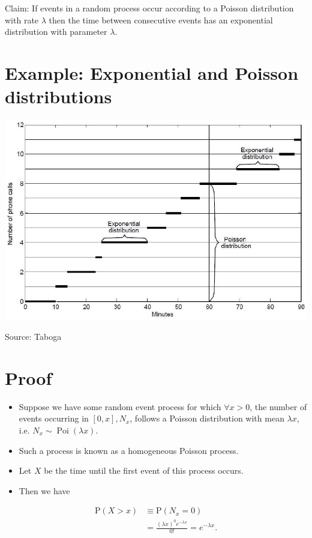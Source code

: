 \documentclass[10pt]{article}
\begin{document}
Claim: If events in a random process occur according to a Poisson distribution with rate $\lambda$ then the time between consecutive events has an exponential distribution with parameter $\lambda$.

\section*{Example: Exponential and Poisson distributions}
\begin{center}
\includegraphics[max width=\textwidth]{2025_05_11_1201cfe24e14b364b4ecg-29}
\end{center}

Source: Taboga

\section*{Proof}
\begin{itemize}
  \item Suppose we have some random event process for which $\forall x>0$, the number of events occurring in $[0, x], N_{x}$, follows a Poisson distribution with mean $\lambda x$, i.e. $N_{x} \sim \operatorname{Poi}(\lambda x)$.
  \item Such a process is known as a homogeneous Poisson process.
  \item Let $X$ be the time until the first event of this process occurs.
  \item Then we have
\end{itemize}

$$
\begin{aligned}
\mathrm{P}(X>x) & \equiv \mathrm{P}\left(N_{x}=0\right) \\
& =\frac{(\lambda x)^{0} e^{-\lambda x}}{0!}=e^{-\lambda x} .
\end{aligned}
$$
\end{document}
